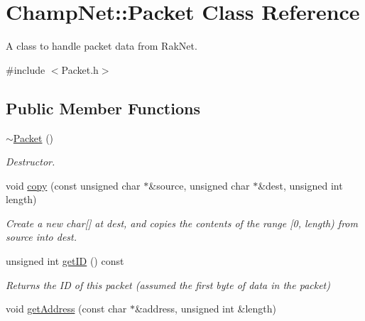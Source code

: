 \hypertarget{class_champ_net_1_1_packet}{\section{Champ\-Net\-:\-:Packet Class Reference}
\label{class_champ_net_1_1_packet}
}


A class to handle packet data from Rak\-Net.  




{\ttfamily \#include $<$Packet.\-h$>$}

\subsection*{Public Member Functions}
\begin{DoxyCompactItemize}
\item 
\hypertarget{class_champ_net_1_1_packet_abc292b1324121a2d367aa7a44275eff5}{\hyperlink{class_champ_net_1_1_packet_abc292b1324121a2d367aa7a44275eff5}{$\sim$\-Packet} ()}\label{class_champ_net_1_1_packet_abc292b1324121a2d367aa7a44275eff5}

\begin{DoxyCompactList}\small\item\em Destructor. \end{DoxyCompactList}\item 
\hypertarget{class_champ_net_1_1_packet_a068e85d829e9fa4b980ec115b40048d3}{void \hyperlink{class_champ_net_1_1_packet_a068e85d829e9fa4b980ec115b40048d3}{copy} (const unsigned char $\ast$\&source, unsigned char $\ast$\&dest, unsigned int length)}\label{class_champ_net_1_1_packet_a068e85d829e9fa4b980ec115b40048d3}

\begin{DoxyCompactList}\small\item\em Create a new char\mbox{[}\mbox{]} at dest, and copies the contents of the range \mbox{[}0, length) from source into dest. \end{DoxyCompactList}\item 
\hypertarget{class_champ_net_1_1_packet_abe3a5de756c64e6890dcf4b0a95a2db7}{unsigned int \hyperlink{class_champ_net_1_1_packet_abe3a5de756c64e6890dcf4b0a95a2db7}{get\-I\-D} () const }\label{class_champ_net_1_1_packet_abe3a5de756c64e6890dcf4b0a95a2db7}

\begin{DoxyCompactList}\small\item\em Returns the I\-D of this packet (assumed the first byte of data in the packet) \end{DoxyCompactList}\item 
\hypertarget{class_champ_net_1_1_packet_a8ab4d17481d7fc08f3c0dc2c48eb9a0a}{void \hyperlink{class_champ_net_1_1_packet_a8ab4d17481d7fc08f3c0dc2c48eb9a0a}{get\-Address} (const char $\ast$\&address, unsigned int \&length)}\label{class_champ_net_1_1_packet_a8ab4d17481d7fc08f3c0dc2c48eb9a0a}


\end{DoxyCompactItemize}
